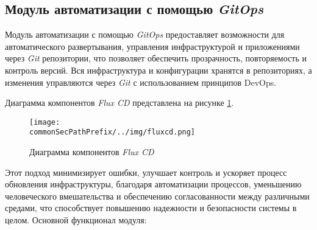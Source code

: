 \subsection{Модуль автоматизации с помощью \textit{GitOps}}
\label{sec:gitops_automation_functionality}

Модуль автоматизации с помощью \textit{GitOps} предоставляет возможности для автоматического развертывания, управления инфраструктурой и приложениями через \textit{Git} репозитории, что позволяет обеспечить прозрачность, повторяемость и контроль версий. Вся инфраструктура и конфигурации хранятся в репозиториях, а изменения управляются через \textit{Git} с использованием принципов DevOps. 

Диаграмма компонентов \textit{Flux CD} представлена на рисунке \ref{fig:gitops_automation_functionality:fluxcd.png}.
\begin{figure}[ht]
    \centering
    \texttt{[image: \\commonSecPathPrefix/../img/fluxcd.png]}
    \caption{Диаграмма компонентов \textit{Flux CD}}
    \label{fig:gitops_automation_functionality:fluxcd.png}
\end{figure}

Этот подход минимизирует ошибки, улучшает контроль и ускоряет процесс обновления инфраструктуры, благодаря автоматизации процессов, уменьшению человеческого вмешательства и обеспечению согласованности между различными средами, что способствует повышению надежности и безопасности системы в целом.
Основной функционал модуля:

